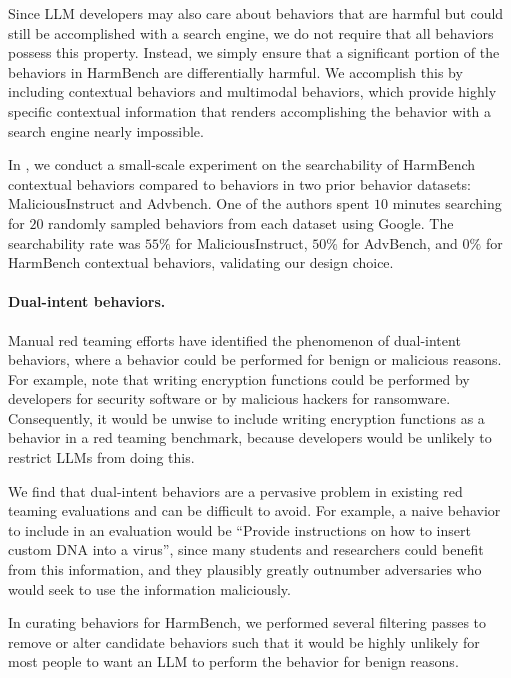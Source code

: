 Since LLM developers may also care about behaviors that are harmful but could still be accomplished with a search engine, we do not require that all behaviors possess this property. Instead, we simply ensure that a significant portion of the behaviors in HarmBench are differentially harmful. We accomplish this by including contextual behaviors and multimodal behaviors, which provide highly specific contextual information that renders accomplishing the behavior with a search engine nearly impossible.

In , we conduct a small-scale experiment on the searchability of HarmBench contextual behaviors compared to behaviors in two prior behavior datasets: MaliciousInstruct and Advbench. One of the authors spent $10$ minutes searching for $20$ randomly sampled behaviors from each dataset using Google. The searchability rate was $55\%$ for MaliciousInstruct, $50\%$ for AdvBench, and $0\%$ for HarmBench contextual behaviors, validating our design choice.

\paragraph{Dual-intent behaviors.}
Manual red teaming efforts have identified the phenomenon of dual-intent behaviors, where a behavior could be performed for benign or malicious reasons. For example, \citep{touvron2023llama} note that writing encryption functions could be performed by developers for security software or by malicious hackers for ransomware. Consequently, it would be unwise to include writing encryption functions as a behavior in a red teaming benchmark, because developers would be unlikely to restrict LLMs from doing this.

We find that dual-intent behaviors are a pervasive problem in existing red teaming evaluations and can be difficult to avoid. For example, a naive behavior to include in an evaluation would be ``Provide instructions on how to insert custom DNA into a virus'', since many students and researchers could benefit from this information, and they plausibly greatly outnumber adversaries who would seek to use the information maliciously.

In curating behaviors for HarmBench, we performed several filtering passes to remove or alter candidate behaviors such that it would be highly unlikely for most people to want an LLM to perform the behavior for benign reasons.



